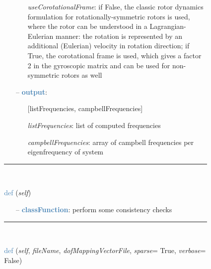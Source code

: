 \begin{itemize}[leftmargin=1.4cm]
\begin{itemize}[leftmargin=0.5cm]
\begin{itemize}[leftmargin=1.4cm]
\begin{itemize}[leftmargin=0.5cm]
\begin{itemize}[leftmargin=0.7cm]
\begin{itemize}[leftmargin=1.2cm]
    \item[] {\it   useCorotationalFrame}: if False, the classic rotor dynamics formulation for rotationally-symmetric rotors is used, where the rotor can be understood in a Lagrangian-Eulerian manner: the rotation is represented by an additional (Eulerian) velocity in rotation direction; if True, the corotational frame is used, which gives a factor 2 in the gyroscopic matrix and can be used for non-symmetric rotors as well
  \end{itemize}
  \item[--]  \textcolor{steelblue}{\bf output}: \vspace{-6pt}
  \begin{itemize}[leftmargin=1.2cm]
\setlength{\itemindent}{-0.7cm}
    \item[] [listFrequencies, campbellFrequencies]
    \item[] {\it   listFrequencies}: list of computed frequencies
    \item[] {\it   campbellFrequencies}: array of campbell frequencies per eigenfrequency of system
  \end{itemize}
\vspace{12pt}\end{itemize}
%
\noindent\rule{8cm}{0.75pt}\vspace{1pt} \\ 
\begin{flushleft}
\noindent \textcolor{steelblue}{def {\bf {}}}\label{sec:FEM:FEMinterface:CheckConsistency}
({\it self})
\end{flushleft}
\setlength{\itemindent}{0.7cm}
\begin{itemize}[leftmargin=0.7cm]
  \item[--]  \textcolor{steelblue}{\bf classFunction}: perform some consistency checks\vspace{12pt}\end{itemize}
%
\noindent\rule{8cm}{0.75pt}\vspace{1pt} \\ 
\begin{flushleft}
\noindent \textcolor{steelblue}{def {\bf {}}}\label{sec:FEM:FEMinterface:ReadMassMatrixFromAnsys}
({\it self}, {\it fileName}, {\it dofMappingVectorFile}, {\it sparse}= True, {\it verbose}= False)
\end{flushleft}

\end{itemize}
\end{itemize}
\end{itemize}
\end{itemize}
